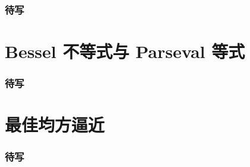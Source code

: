 \begin{frame}
\frametitle{待写}

\end{frame}


\section{Bessel 不等式与 Parseval 等式}


\begin{frame}
\frametitle{待写}

\end{frame}


\section{最佳均方逼近}


\begin{frame}
\frametitle{待写}

\end{frame}



